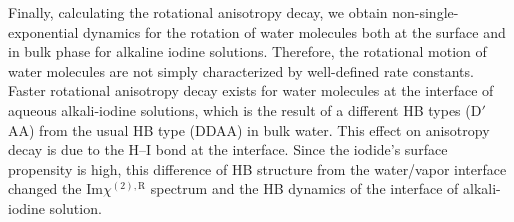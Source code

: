 Finally, calculating the rotational anisotropy decay, we obtain non-single-exponential dynamics 
for the rotation of water molecules both at the surface and in bulk phase for alkaline 
iodine solutions. Therefore, the rotational motion of water molecules are not simply characterized by well-defined rate constants. 
Faster rotational anisotropy decay exists for water molecules at the interface of aqueous alkali-iodine solutions, 
which is the result of a different HB types (D$'$AA) from the usual HB type (DDAA) in bulk water. 
This effect on anisotropy decay is due to the H--I bond at the interface. Since the iodide's surface propensity is high, 
this difference of HB structure from the water/vapor interface changed the Im$\chi^{(2),\text{R}}$ spectrum and the HB dynamics 
of the interface of alkali-iodine solution. 




